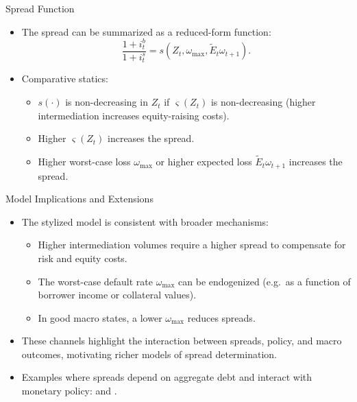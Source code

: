 \documentclass[11pt,aspectratio=169]{beamer}
\begin{document}
\begin{frame}{Spread Function}
\small
\begin{itemize}
  \item The spread can be summarized as a reduced-form function:
  \[
    \frac{1+i_t^b}{1+i_t^s}
    = s\!\left(Z_t,\omega_{\max},\tilde{E}_t\omega_{t+1}\right).
  \]
  \vspace{0.25em}
  \item Comparative statics:
  \begin{itemize}
    \item $s(\cdot)$ is non-decreasing in $Z_t$ if $\varsigma(Z_t)$ is non-decreasing (higher intermediation increases equity-raising costs).
    \item Higher $\varsigma(Z_t)$ increases the spread.
    \item Higher worst-case loss $\omega_{\max}$ or higher expected loss $\tilde{E}_t\omega_{t+1}$ increases the spread.
  \end{itemize}
\end{itemize}
\end{frame}

\begin{frame}{Model Implications and Extensions}
\small
\begin{itemize}
  \item The stylized model is consistent with broader mechanisms:
  \begin{itemize}
    \item Higher intermediation volumes require a higher spread to compensate for risk and equity costs.
    \item The worst-case default rate $\omega_{\max}$ can be endogenized (e.g.\ as a function of borrower income or collateral values).
    \item In good macro states, a lower $\omega_{\max}$ reduces spreads.
  \end{itemize}
  \vspace{0.25em}
  \item These channels highlight the interaction between spreads, policy, and macro outcomes, motivating richer models of spread determination.
  \vspace{0.25em}
  \item Examples where spreads depend on aggregate debt and interact with monetary policy:
  \textcite{BenignoEtAl2020} and \textcite{CurdiaWoodford2010,CurdiaWoodford2011}.
\end{itemize}
\end{frame}
\end{document}
